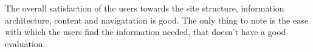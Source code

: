 \begin{center}
\end{center}

The overall satisfaction of the users towards the site structure, information architecture, content and navigatation is good. The only thing to note is the ease with which the users find the information needed, that doesn't have a good evaluation.

